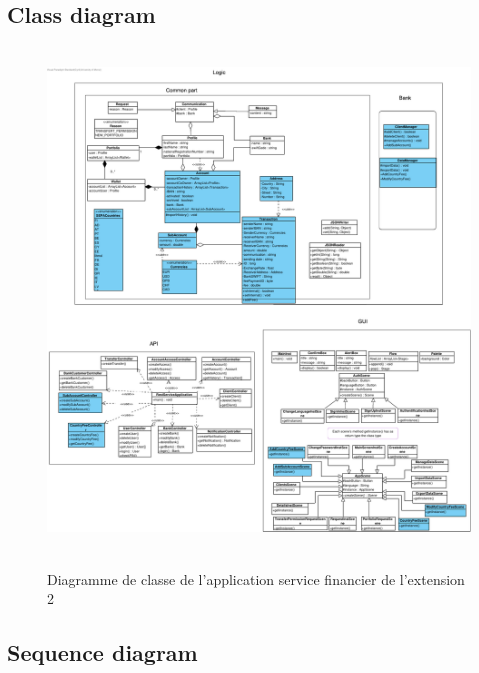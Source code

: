 \documentclass[]{report}
\begin{document}
\newpage

\subsection{Class diagram}

\begin{figure}[h!]
	\hbox{
		\centering\includegraphics[width=\linewidth]{img/Class Diagram Institution - Extension 2.pdf}
	}
	\caption{Diagramme de classe de l'application service financier de l'extension 2}
\end{figure}

\newpage

\subsection{Sequence diagram}
\end{document}
